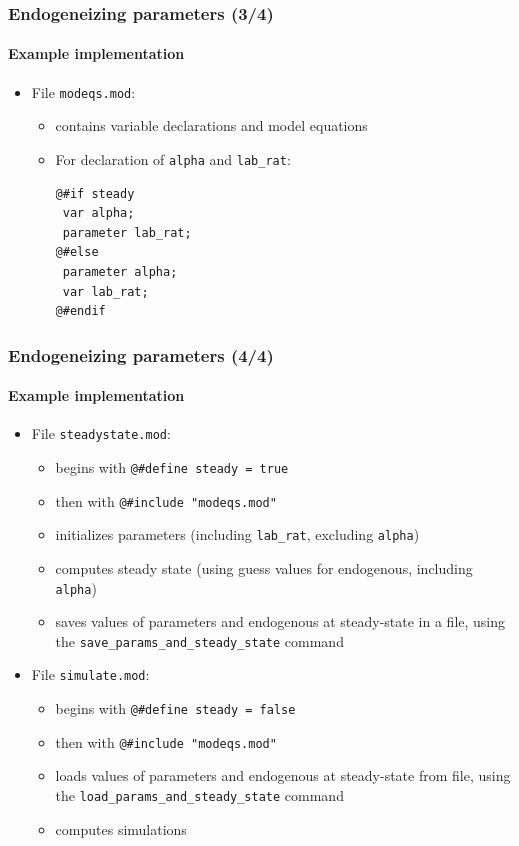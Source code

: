 \documentclass{beamer}
\begin{document}
\begin{frame}[fragile=singleslide]
  \frametitle{Endogeneizing parameters (3/4)}
  \framesubtitle{Example implementation}
  \begin{itemize}
  \item File \texttt{modeqs.mod}:
    \begin{itemize}
    \item contains variable declarations and model equations
    \item For declaration of \texttt{alpha} and \texttt{lab\_rat}:
    \footnotesize
\begin{verbatim}
@#if steady
 var alpha;
 parameter lab_rat;
@#else
 parameter alpha;
 var lab_rat;
@#endif
\end{verbatim}
    \normalsize
    \end{itemize}

  \end{itemize}
\end{frame}

\begin{frame}[fragile=singleslide]
  \frametitle{Endogeneizing parameters (4/4)}
  \framesubtitle{Example implementation}
  \begin{itemize}
  \item File \texttt{steadystate.mod}:
    \begin{itemize}
    \item begins with \verb+@#define steady = true+
    \item then with \verb+@#include "modeqs.mod"+
    \item initializes parameters (including \texttt{lab\_rat}, excluding \texttt{alpha})
    \item computes steady state (using guess values for endogenous, including \texttt{alpha})
    \item saves values of parameters and endogenous at steady-state in a file, using the \texttt{save\_params\_and\_steady\_state} command
    \end{itemize}
  \item File \texttt{simulate.mod}:
    \begin{itemize}
    \item begins with \verb+@#define steady = false+
    \item then with \verb+@#include "modeqs.mod"+
    \item loads values of parameters and endogenous at steady-state from file, using the \texttt{load\_params\_and\_steady\_state} command
    \item computes simulations
    \end{itemize}
  \end{itemize}
\end{frame}
\end{document}

